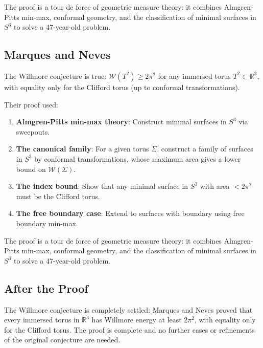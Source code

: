 \begin{highlightbox}
The proof is a tour de force of geometric measure theory: it combines Almgren-Pitts min-max, conformal geometry, and the classification of minimal surfaces in $S^3$ to solve a 47-year-old problem.
\end{highlightbox}

\subsection{Marques and Neves \cite{marquesneves2014}}

\begin{theorem}
The Willmore conjecture is true: $\mathcal{W}(T^2) \ge 2\pi^2$ for any immersed torus $T^2 \subset \mathbb{R}^3$, with equality only for the Clifford torus (up to conformal transformations).
\end{theorem}

Their proof used:
\begin{enumerate}
\item \textbf{Almgren-Pitts min-max theory}: Construct minimal surfaces in $S^3$ via sweepouts.
\item \textbf{The canonical family}: For a given torus $\Sigma$, construct a family of surfaces in $S^3$ by conformal transformations, whose maximum area gives a lower bound on $\mathcal{W}(\Sigma)$.
\item \textbf{The index bound}: Show that any minimal surface in $S^3$ with area $< 2\pi^2$ must be the Clifford torus.
\item \textbf{The free boundary case}: Extend to surfaces with boundary using free boundary min-max.
\end{enumerate}

\begin{highlightbox}
The proof is a tour de force of geometric measure theory: it combines Almgren-Pitts min-max, conformal geometry, and the classification of minimal surfaces in $S^3$ to solve a 47-year-old problem.
\end{highlightbox}

\subsection{After the Proof}

The Willmore conjecture is completely settled: Marques and Neves proved that every immersed torus in $\mathbb{R}^3$ has Willmore energy at least $2\pi^2$, with equality only for the Clifford torus. The proof is complete and no further cases or refinements of the original conjecture are needed.

